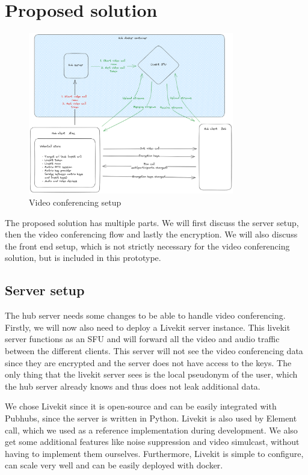 \documentclass{report}
\begin{document}
\chapter{Proposed solution}
\begin{figure}[!hbt]
\centering
\includegraphics[width=0.8\textwidth]{img/PH_videocall.excalidraw.png}
\caption{Video conferencing setup}
\label{fig:video-conference-setup}
\end{figure}

The proposed solution has multiple parts. We will first discuss the server setup, then the video conferencing flow
and lastly the encryption. We will also discuss the front end setup, which is not strictly necessary for the video
conferencing solution, but is included in this prototype.

\section{Server setup}
The hub server needs some changes to be able to handle video conferencing. Firstly, we will now also need to deploy a
Livekit server instance. This livekit server functions as an SFU and will forward all the video and audio traffic
between the different clients. This server will not see the video conferencing data since they are
encrypted and the server does not have access to the keys. The only thing that the livekit server sees is the local
pseudonym of the user, which the hub server already knows and thus does not leak additional data.

We chose Livekit since it is open-source and can be easily integrated with Pubhubs, since the server is written in
Python. Livekit is also used by Element call, which we used as a reference implementation during development. We
also get some additional features like noise suppression and video simulcast, without having to implement them
ourselves. Furthermore, Livekit is simple to configure, can scale very well and can be easily deployed with docker.
\end{document}
